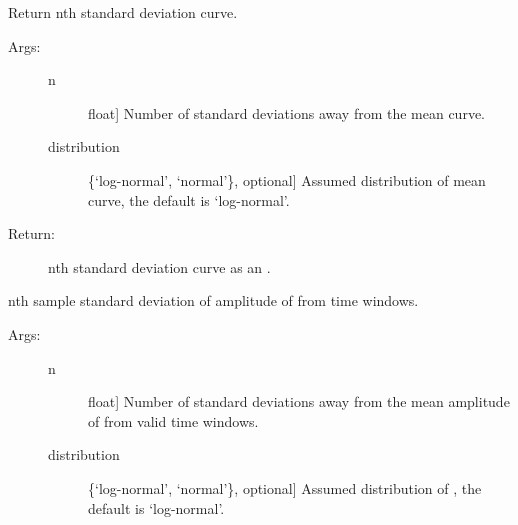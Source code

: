 \documentclass[letterpaper,10pt,english,openany,oneside]{sphinxmanual}
\begin{document}
\begin{fulllineitems}

\begin{fulllineitems}
\label{\detokenize{index:hvsrpy.Hvsr.nstd_curve}}
Return nth standard deviation curve.
\begin{description}
\item[{Args:}] \leavevmode\begin{description}
\item[{n}] \leavevmode{[}float{]}
Number of standard deviations away from the mean curve.

\item[{distribution}] \leavevmode{[}\{‘log-normal’, ‘normal’\}, optional{]}
Assumed distribution of mean curve, the default is
‘log-normal’.

\end{description}

\item[{Return:}] \leavevmode
nth standard deviation curve as an .

\end{description}

\end{fulllineitems}


\begin{fulllineitems}
\label{\detokenize{index:hvsrpy.Hvsr.nstd_f0_amp}}
nth sample standard deviation of amplitude of  from time
windows.
\begin{description}
\item[{Args:}] \leavevmode\begin{description}
\item[{n}] \leavevmode{[}float{]}
Number of standard deviations away from the mean
amplitude of  from valid time windows.

\item[{distribution}] \leavevmode{[}\{‘log-normal’, ‘normal’\}, optional{]}
Assumed distribution of , the default is
‘log-normal’.

\end{description}


\end{description}
\end{fulllineitems}
\end{fulllineitems}
\end{document}
